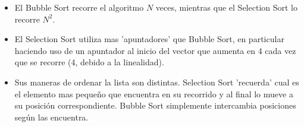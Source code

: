 \documentclass[titlepage]{article}
\begin{document}
\begin{itemize}
    \item El Bubble Sort recorre el algoritmo $N$ veces, mientras que el Selection Sort lo recorre $N^2$.
    \item El Selection Sort utiliza mas 'apuntadores' que Bubble Sort, en particular haciendo uso de un apuntador al inicio del vector que aumenta en 4 cada vez que se recorre (4, debido a la linealidad).
    \item Sus maneras de ordenar la lista son distintas. Selection Sort 'recuerda' cual es el elemento mas pequeño que encuentra en su recorrido y al final lo mueve a su posición correspondiente. Bubble Sort simplemente intercambia posiciones según las encuentra.
\end{itemize}
\end{document}
